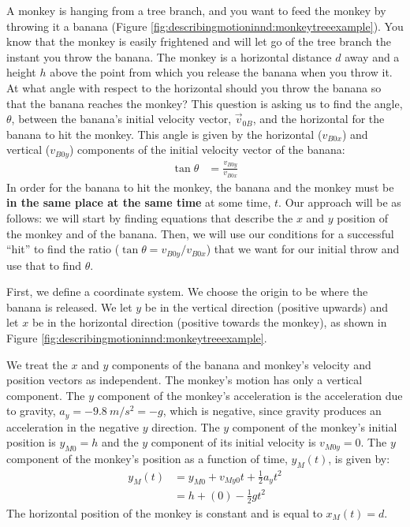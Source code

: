 \begin{example}{
A monkey is hanging from a tree branch, and you want to feed the monkey by throwing it a banana (Figure \ref{fig:describingmotioninnd:monkeytreeexample}). You know that the monkey is easily frightened and will let go of the tree branch the instant you throw the banana. The monkey is a horizontal distance $d$ away and a height $h$ above the point from which you release the banana when you throw it. At what angle with respect to the horizontal should you throw the banana so that the banana reaches the monkey? 
}
This question is asking us to find the angle, $\theta$, between the banana's initial velocity vector, $\vec v_{0B}$, and the horizontal for the banana to hit the monkey. This angle is given by the horizontal ($v_{B0x}$) and vertical ($v_{B0y}$) components of the initial velocity vector of the banana:
\begin{align*}
\tan\theta&=\frac{v_{B0y}}{v_{B0x}}
\end{align*}
In order for the banana to hit the monkey, the banana and the monkey must be \textbf{in the same place at the same time} at some time, $t$. Our approach will be as follows: we will start by finding equations that describe the $x$ and $y$ position of the monkey and of the banana. Then, we will use our conditions for a successful ``hit'' to find the ratio ($\tan\theta=v_{B0y}/v_{B0x}$) that we want for our initial throw and use that to find $\theta$.

First, we define a coordinate system. We choose the origin to be where the banana is released. We let $y$ be in the vertical direction (positive upwards) and let $x$ be in the horizontal direction (positive towards the monkey), as shown in Figure \ref{fig:describingmotioninnd:monkeytreeexample}. 

We treat the $x$ and $y$ components of the banana and monkey's velocity and position vectors as independent. The monkey's motion has only a vertical component. The $y$ component of the monkey's acceleration is the acceleration due to gravity, $a_y=-\SI{9.8}{m/s^2}= -g$, which is negative, since gravity produces an acceleration in the negative $y$ direction. The $y$ component of the monkey's initial position is $y_{M0}=h$ and the $y$ component of its initial velocity is $v_{M0y}=0$. The $y$ component of the monkey's position as a function of time, $y_M(t)$, is given by:
\begin{align*}
y_M(t)&=y_{M0}+v_{My0}t+\frac{1}{2}a_yt^2\\
&=h+(0)-\frac{1}{2}gt^2
\end{align*}
The horizontal position of the monkey is constant and is equal to $x_M(t)=d$.


\end{example}
